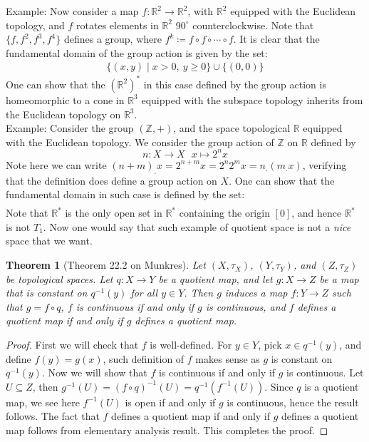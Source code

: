 \documentclass[11pt]{book}
\theoremstyle{break}
\theoremstyle{break}
\newtheorem{thm}{Theorem}[section]
\newcommand{\R}{\mathbb{R}}
\newcommand{\Z}{\mathbb{Z}}
\newcommand{\example}{\color{green}Example: \color{black}}
\begin{document}
\example Now consider a map $f:\R^2 \to \R^2$, with $\R^2$ equipped with the Euclidean topology, and $f$ rotates elements in $\R^2$ $90^\circ$ counterclockwise. Note that $\{f,f^2,f^3,f^4\}$ defines a group, where $f^k \coloneqq f\circ f\circ \cdots\circ f$. It is clear that the fundamental domain of the group action is given by the set:
\begin{align*}
\{(x,y) \mid x>0, \ y \geq 0\}\cup \{(0,0)\}
\end{align*}
One can show that the $(\R^2)^*$ in this case defined by the group action is homeomorphic to a cone in $\R^3$ equipped with the subspace topology inherits from the Euclidean topology on $\R^3$. \\

\example Consider the group $(\Z,+)$, and the space topological $\R$ equipped with the Euclidean topology. We consider the group action of $\Z$ on $\R$ defined by $$n:X \to X \ \ \ x\mapsto 2^n x$$ 
Note here we can write $(n+m)_.x = 2^{n+m}x = 2^n2^mx = n_.(m_.x)$, verifying that the definition does define a group action on $X$. One can show that the fundamental domain in such case is defined by the set:
\begin{align*}
[-1,-1/2)\cup \{0\} \cup (1/2,1]
\end{align*}
Note that $\R^*$ is the only open set in $\R^*$ containing the origin $[0]$, and hence $\R^*$ is not $T_1$. Now one would say that such example of quotient space is not a \textit{nice} space that we want.\\

\begin{thm}[Theorem 22.2 on Munkres]
Let $(X,\tau_X)$, $(Y,\tau_Y)$, and $(Z,\tau_Z)$ be topological spaces. Let $q: X\to Y$ be a quotient map, and let $g:X \to Z$ be a map that is constant on $q^{-1}(y)$ for all $y \in Y$. Then $g$ induces a map $f:Y \to Z$ such that $g = f\circ q$, $f$ is continuous if and only if $g$ is continuous, and $f$ defines a quotient map if and only if $g$ defines a quotient map. 
\end{thm}
\begin{proof}
First we will check that $f$ is well-defined. For $y \in Y$, pick $x \in q^{-1}(y)$, and define $f(y) = g(x)$, such definition of $f$ makes sense as $g$ is constant on $q^{-1}(y)$. Now we will show that $f$ is continuous if and only if $g$ is continuous. Let $U \subseteq Z$, then $g^{-1}(U) = (f\circ q)^{-1}(U) = q^{-1}(f^{-1}(U))$. Since $q$ is a quotient map, we see here $f^{-1}(U)$ is open if and only if $g$ is continuous, hence the result follows. The fact that  $f$ defines a quotient map if and only if $g$ defines a quotient map follows from elementary analysis result. This completes the proof. 
\end{proof}
\end{document}
